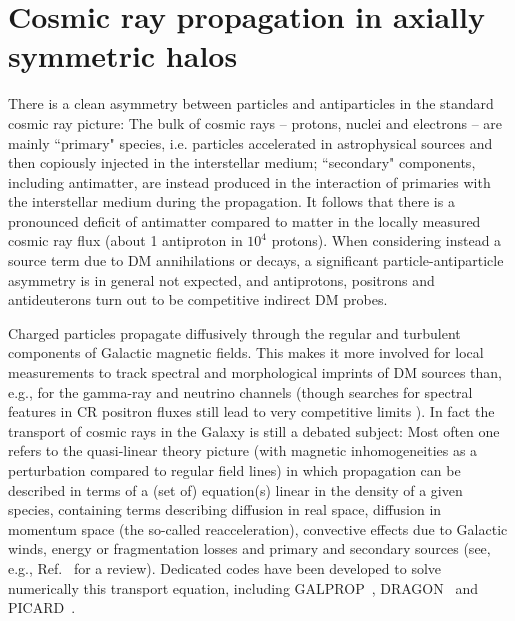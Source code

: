 \documentclass[a4paper,10pt,oneside]{book}
\begin{document}
\section{Cosmic ray propagation in axially symmetric halos}

There is a clean asymmetry between particles and antiparticles in the standard cosmic ray picture:
The bulk of cosmic rays -- protons, nuclei and electrons -- are mainly ``primary" species, i.e. particles
accelerated in astrophysical sources and then copiously injected in the interstellar medium;
``secondary" components, including antimatter, are instead produced in the interaction of primaries 
with the interstellar
medium during the propagation. It follows that there is a pronounced deficit of antimatter compared to matter 
in the locally measured cosmic ray flux (about 1 antiproton in $10^4$ protons). When considering instead a
source term due to DM annihilations or decays, a significant particle-antiparticle asymmetry is in general
not expected, and antiprotons, positrons and antideuterons turn out to be competitive indirect DM probes.

Charged particles propagate diffusively through the regular and turbulent components of Galactic magnetic 
fields. This makes it more involved for local measurements to track spectral and morphological imprints of 
DM sources than, e.g., for the gamma-ray and neutrino channels (though searches for spectral features
in CR positron fluxes still lead to very competitive limits \cite{Bergstrom:2013jra}).
In fact the transport of cosmic rays in the Galaxy is still a debated
subject: Most often one refers to the quasi-linear theory picture (with magnetic inhomogeneities as a perturbation 
compared to regular field lines) in which propagation can be described in terms of a (set of) equation(s) linear
in the density of a given species, containing terms describing diffusion in real space, diffusion in momentum
space (the so-called reacceleration), convective effects due to Galactic winds, energy or fragmentation
losses and primary and secondary sources (see, e.g., Ref.~\cite{Strong:2007nh} for a review).
Dedicated codes have been developed to solve numerically this transport equation, including GALPROP~\cite{Strong:1998pw}, DRAGON~\cite{Evoli:2016xgn} and PICARD~\cite{Kissmann:2014sia}. 
\end{document}
